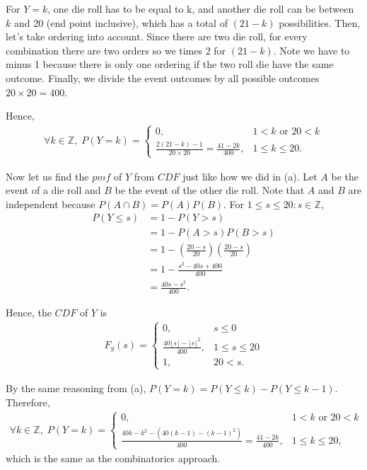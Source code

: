 \documentclass{article}
\begin{document}
\begin{enumerate}[label={(\alph*)}]
    For $Y=k$, one die roll has to be equal to k, and another die roll can be between $k$ and 20 (end point inclusive), which has a total of $(21-k)$ possibilities.
    Then, let's take ordering into account. Since there are two die roll, for every combination there are two orders so we times 2 for $(21-k)$.
    Note we have to minus 1 because there is only one ordering if the two roll die have the same outcome. 
    Finally, we divide the event outcomes by all possible outcomes $20 \times 20 = 400$.

    Hence, 
    \begin{align}
        \forall k \in \mathbb{Z}, \; P(Y=k)=
        \begin{cases}
            0, & 1<k \text{ or } 20<k \\
            \frac{2(21-k)-1}{20 \times 20}=\frac{41-2k}{400}, & 1 \le k \le 20.
        \end{cases}
    \end{align}

    Now let us find the $pmf$ of $Y$ from $CDF$ just like how we did in (a). 
    Let $A$ be the event of a die roll and $B$ be the event of the other die roll. Note that $A$ and $B$ are independent because $P(A \cap B)=P(A)P(B)$. 
    For $1 \le s \le 20: s \in \mathbb{Z}$,
    \begin{align}
        P(Y \le s) & = 1-P(Y > s) \\
        & = 1-P(A>s)P(B>s) \\
        & = 1-(\frac{20-s}{20})(\frac{20-s}{20}) \\
        & = 1-\frac{s^2-40s+400}{400} \\
        & = \frac{40s-s^2}{400}.
    \end{align}

    Hence, the $CDF$ of $Y$ is 
    \begin{align}
        F_y(s) = 
            \begin{cases}
                0, & s \le 0 \\
                \frac{40 \lfloor s \rfloor -\lfloor s \rfloor ^2}{400}, & 1 \le s \le 20 \\
                1, & 20 < s.
            \end{cases}  
    \end{align}

    By the same reasoning from (a), $P(Y=k)=P(Y \le k)-P(Y \le k-1)$.
    Therefore, 
    \begin{align}
        \forall k \in \mathbb{Z}, \; P(Y=k)=
        \begin{cases}
            0, & 1<k \text{ or } 20<k \\
            \frac{40k-k^2-\left(40(k-1)-(k-1)^2\right)}{400}=\frac{41-2k}{400}, & 1 \le k \le 20,
        \end{cases}
    \end{align}
    which is the same as the combinatorics approach.
\end{enumerate}
\end{document}
